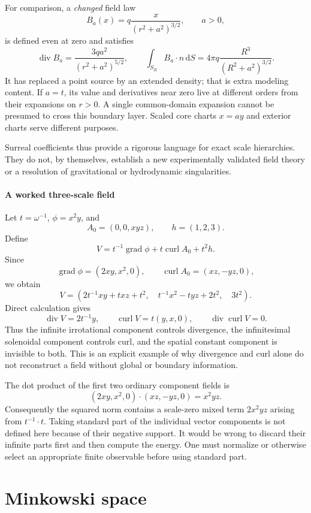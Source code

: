 \documentclass[11pt,letterpaper]{article}
\theoremstyle{definition}
\theoremstyle{remark}
\newcommand{\grad}{\operatorname{grad}}\newcommand{\Div}{\operatorname{div}}
\newcommand{\curl}{\operatorname{curl}}
\newcommand{\dd}{\mathrm d}
\begin{document}
For comparison, a \emph{changed} field law
\[
 B_a(x)=q\frac{x}{(r^2+a^2)^{3/2}},\qquad a>0,
\]
is defined even at zero and satisfies
\[
 \Div B_a=\frac{3qa^2}{(r^2+a^2)^{5/2}},\qquad
 \int_{S_R}B_a\cdot n\,\dd S
 =4\pi q\frac{R^3}{(R^2+a^2)^{3/2}}.
\]
It has replaced a point source by an extended density; that is extra modeling content. If $a=t$, its value and derivatives near zero live at different orders from their expansions on $r>0$. A single common-domain expansion cannot be presumed to cross this boundary layer. Scaled core charts $x=ay$ and exterior charts serve different purposes.

Surreal coefficients thus provide a rigorous language for exact scale hierarchies. They do not, by themselves, establish a new experimentally validated field theory or a resolution of gravitational or hydrodynamic singularities.

\subsection{A worked three-scale field}\label{vtf:3d:subsec:worked}

Let $t=\omega^{-1}$, $\phi=x^2y$, and
\[
 A_0=(0,0,xyz),\qquad h=(1,2,3).
\]
Define
\[
 V=t^{-1}\grad\phi+t\curl A_0+t^2h.
\]
Since
\[
 \grad\phi=(2xy,x^2,0),\qquad
 \curl A_0=(xz,-yz,0),
\]
we obtain
\[
 V=(2t^{-1}xy+txz+t^2,\quad
     t^{-1}x^2-tyz+2t^2,\quad3t^2).
\]
Direct calculation gives
\[
 \Div V=2t^{-1}y,\qquad
 \curl V=t(y,x,0),\qquad
 \Div\curl V=0.
\]
Thus the infinite irrotational component controls divergence, the infinitesimal solenoidal component controls curl, and the spatial constant component is invisible to both. This is an explicit example of why divergence and curl alone do not reconstruct a field without global or boundary information.

The dot product of the first two ordinary component fields is
\[
 (2xy,x^2,0)\cdot(xz,-yz,0)=x^2yz.
\]
Consequently the squared norm contains a scale-zero mixed term $2x^2yz$ arising from $t^{-1}\cdot t$. Taking standard part of the individual vector components is not defined here because of their negative support. It would be wrong to discard their infinite parts first and then compute the energy. One must normalize or otherwise select an appropriate finite observable before using standard part.

\part{Minkowski space}\label{vtf:part:mink}
\end{document}

